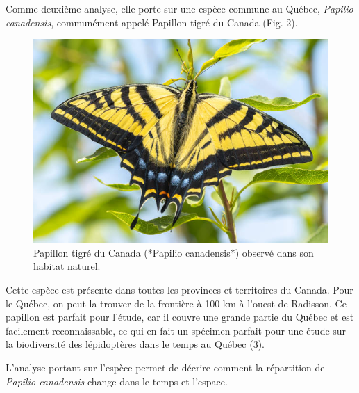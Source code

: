 \documentclass[9pt,twocolumn,twoside,]{pnas-new}
\begin{document}
Comme deuxième analyse, elle porte sur une espèce commune au Québec,
\emph{Papilio canadensis}, communément appelé Papillon tigré du Canada
(Fig. 2).

\begin{figure}

{\centering \includegraphics[width=0.8\linewidth]{Papilio_canadensis} 

}

\caption{Papillon tigré du Canada (*Papilio canadensis*) observé dans son habitat naturel.}\label{fig:fig-papilio}
\end{figure}

Cette espèce est présente dans toutes les provinces et territoires du
Canada. Pour le Québec, on peut la trouver de la frontière à 100 km à
l'ouest de Radisson. Ce papillon est parfait pour l'étude, car il couvre
une grande partie du Québec et est facilement reconnaissable, ce qui en
fait un spécimen parfait pour une étude sur la biodiversité des
lépidoptères dans le temps au Québec (3).

L'analyse portant sur l'espèce permet de décrire comment la répartition
de \emph{Papilio canadensis} change dans le temps et l'espace.
\end{document}
